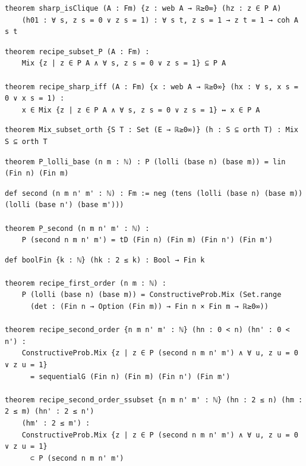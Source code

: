 \label{lean:sharp-isclique}
\begin{lstlisting}
theorem sharp_isClique (A : Fm) {z : web A → ℝ≥0∞} (hz : z ∈ P A)
    (h01 : ∀ s, z s = 0 ∨ z s = 1) : ∀ s t, z s = 1 → z t = 1 → coh A s t
\end{lstlisting}

\label{lean:recipe-subset-p}
\begin{lstlisting}
theorem recipe_subset_P (A : Fm) :
    Mix {z | z ∈ P A ∧ ∀ s, z s = 0 ∨ z s = 1} ⊆ P A

theorem recipe_sharp_iff (A : Fm) {x : web A → ℝ≥0∞} (hx : ∀ s, x s = 0 ∨ x s = 1) :
    x ∈ Mix {z | z ∈ P A ∧ ∀ s, z s = 0 ∨ z s = 1} ↔ x ∈ P A
\end{lstlisting}

\label{lean:mix-subset-orth}
\begin{lstlisting}
theorem Mix_subset_orth {S T : Set (E → ℝ≥0∞)} (h : S ⊆ orth T) : Mix S ⊆ orth T
\end{lstlisting}

\label{lean:p-lolli-base}
\begin{lstlisting}
theorem P_lolli_base (n m : ℕ) : P (lolli (base n) (base m)) = lin (Fin n) (Fin m)
\end{lstlisting}

\label{lean:p-second}
\begin{lstlisting}
def second (n m n' m' : ℕ) : Fm := neg (tens (lolli (base n) (base m)) (lolli (base n') (base m')))

theorem P_second (n m n' m' : ℕ) :
    P (second n m n' m') = tD (Fin n) (Fin m) (Fin n') (Fin m')
\end{lstlisting}

\label{lean:recipe-formula}
\begin{lstlisting}
def boolFin {k : ℕ} (hk : 2 ≤ k) : Bool → Fin k

theorem recipe_first_order (n m : ℕ) :
    P (lolli (base n) (base m)) = ConstructiveProb.Mix (Set.range
      (det : (Fin n → Option (Fin m)) → Fin n × Fin m → ℝ≥0∞))

theorem recipe_second_order {n m n' m' : ℕ} (hn : 0 < n) (hn' : 0 < n') :
    ConstructiveProb.Mix {z | z ∈ P (second n m n' m') ∧ ∀ u, z u = 0 ∨ z u = 1}
      = sequentialG (Fin n) (Fin m) (Fin n') (Fin m')

theorem recipe_second_order_ssubset {n m n' m' : ℕ} (hn : 2 ≤ n) (hm : 2 ≤ m) (hn' : 2 ≤ n')
    (hm' : 2 ≤ m') :
    ConstructiveProb.Mix {z | z ∈ P (second n m n' m') ∧ ∀ u, z u = 0 ∨ z u = 1}
      ⊂ P (second n m n' m')
\end{lstlisting}

